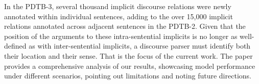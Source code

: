In the PDTB-3, several thousand implicit discourse relations were newly annotated within individual sentences, adding to the over 15,000 implicit relations annotated across adjacent sentences in the PDTB-2. Given that the position of the arguments to these intra-sentential implicits is no longer as well-defined as with inter-sentential implicits, a discourse parser must identify both their location and their sense. That is the focus of the current work. The paper provides a comprehensive analysis of our results, showcasing model performance under different scenarios, pointing out limitations and noting future directions.
